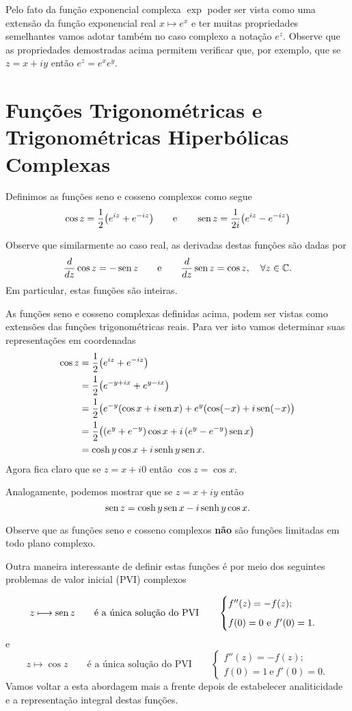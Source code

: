 Pelo fato da função exponencial complexa $\exp$ poder 
ser vista como uma extensão da função exponencial
real $x\longmapsto e^{x}$ e ter muitas propriedades semelhantes 
vamos adotar também no caso complexo a notação $e^z$. 
Observe que as propriedades demostradas acima permitem verificar que, por exemplo,
que se $z=x+iy$ então $e^z=e^xe^y$.


\section{Funções Trigonométricas e Trigonométricas Hiperbólicas Complexas}

Definimos as funções seno e cosseno complexos como segue 
\[
\cos z = \frac{1}{2}\big( e^{iz}+e^{-iz} \big)
\qquad\text{e}\qquad 
\operatorname{sen} z = \frac{1}{2i}\big( e^{iz}-e^{-iz} \big)
\]

Observe que similarmente ao caso real, as derivadas destas funções são dadas por
\[
\frac{d}{dz}\cos z = -\operatorname{sen} z 
\qquad\text{e}\qquad
\frac{d}{dz}\operatorname{sen} z = \cos z,
\quad \forall z\in \mathbb{C}.
\]
Em particular, estas funções são inteiras. 

As funções seno e cosseno complexas definidas acima, 
podem ser vistas como extensões das funções trigonométricas 
reais. Para ver isto vamos determinar suas representações em coordenadas
\begin{align*}
\cos z 
&= 
\frac{1}{2}\big( e^{iz}+e^{-iz} \big)
\\
&=
\frac{1}{2}\big( e^{-y+ix}+e^{y-ix} \big)
\\
&=
\frac{1}{2}\big( e^{-y}(\cos x+i\operatorname{sen} x)+ e^{y}(\cos(-x)+i\operatorname{sen}(-x) \big)
\\
&=
\frac{1}{2}\big( (e^{y}+e^{-y}) \cos x +i\, (e^{y}-e^{-y}) \operatorname{sen} x  \big)
\\
&=
\cosh y \cos x +i \operatorname{senh} y \operatorname{sen} x.
\end{align*}
Agora fica claro que se $z=x+i0$ então $\cos z = \cos x$.  

Analogamente, podemos mostrar que se $z=x+iy$ então 
\[
\operatorname{sen} z =  \cosh y \operatorname{sen} x -i \operatorname{senh} y \cos x.
\]

Observe que as funções seno e cosseno complexos \textbf{não} são funções limitadas
em todo plano complexo.

Outra maneira interessante de definir estas funções é por meio dos seguintes
problemas de valor inicial (PVI) complexos

\[
z\longmapsto \operatorname{sen} z
\qquad \text{é a única solução do PVI}
\qquad 
\begin{cases}
f''(z)=-f(z);
\\[0.2cm]
f(0)=0 \ \text{e}\ f'(0)=1.
\end{cases}
\]
e
\[
z\longmapsto \cos z
\qquad \text{é a única solução do PVI}
\qquad 
\begin{cases}
f''(z)=-f(z);
\\[0.2cm]
f(0)=1 \ \text{e}\ f'(0)=0.
\end{cases}
\]
Vamos voltar a esta abordagem mais a frente depois de estabelecer 
analiticidade e a representação integral destas funções. \\



